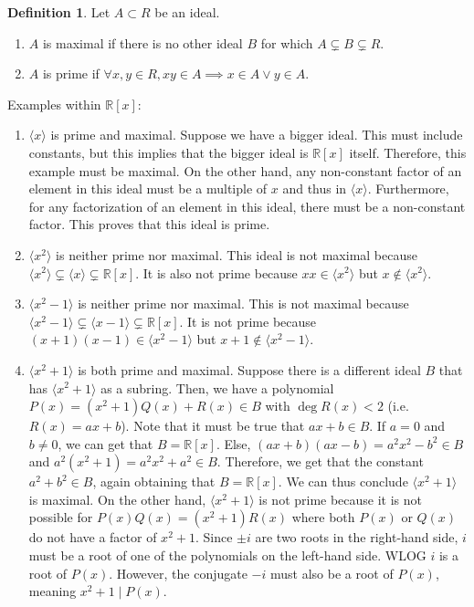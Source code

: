 \documentclass{article}
\theoremstyle{definition}
\newtheorem{definition}{Definition}
\theoremstyle{plain}
\theoremstyle{corollary}
\theoremstyle{lemma}
\begin{document}
\begin{definition}
    Let $A\subset R$ be an ideal.
    \begin{enumerate}
        \item $A$ is maximal if there is no other ideal $B$ for which $A\subsetneq B\subsetneq R$.
        \item $A$ is prime if $\forall x,y\in R,xy\in A\implies x\in A\lor y\in A$.
    \end{enumerate}
\end{definition}

Examples within $\mathbb{R}[x]$:
\begin{enumerate}
    \item $\langle x\rangle$ is prime and maximal. Suppose we have a bigger ideal. This must include constants, but this implies that the bigger ideal is $\mathbb{R}[x]$ itself. Therefore, this example must be maximal. On the other hand, any non-constant factor of an element in this ideal must be a multiple of $x$ and thus in $\langle x\rangle$. Furthermore, for any factorization of an element in this ideal, there must be a non-constant factor. This proves that this ideal is prime.
    \item $\langle x^2\rangle$ is neither prime nor maximal. This ideal is not maximal because $\langle x^2\rangle\subsetneq\langle x\rangle\subsetneq\mathbb{R}[x]$. It is also not prime because $xx\in\langle x^2\rangle$ but $x\notin\langle x^2\rangle$.
    \item $\langle x^2-1\rangle$ is neither prime nor maximal. This is not maximal because $\langle x^2-1\rangle\subsetneq\langle x-1\rangle\subsetneq\mathbb{R}[x]$. It is not prime because $(x+1)(x-1)\in\langle x^2-1\rangle$ but $x+1\notin\langle x^2-1\rangle$.
    \item $\langle x^2+1\rangle$ is both prime and maximal. Suppose there is a different ideal $B$ that has $\langle x^2+1\rangle$ as a subring. Then, we have a polynomial $P(x)=(x^2+1)Q(x)+R(x)\in B$ with $\deg R(x)<2$ (i.e. $R(x)=ax+b$). Note that it must be true that $ax+b\in B$. If $a=0$ and $b\neq0$, we can get that $B=\mathbb{R}[x]$. Else, $(ax+b)(ax-b)=a^2x^2-b^2\in B$ and $a^2(x^2+1)=a^2x^2+a^2\in B$. Therefore, we get that the constant $a^2+b^2\in B$, again obtaining that $B=\mathbb{R}[x]$. We can thus conclude $\langle x^2+1\rangle$ is maximal. On the other hand, $\langle x^2+1\rangle$ is not prime because it is not possible for $P(x)Q(x)=(x^2+1)R(x)$ where both $P(x)$ or $Q(x)$ do not have a factor of $x^2+1$. Since $\pm i$ are two roots in the right-hand side, $i$ must be a root of one of the polynomials on the left-hand side. WLOG $i$ is a root of $P(x)$. However, the conjugate $-i$ must also be a root of $P(x)$, meaning $x^2+1\mid P(x)$.
\end{enumerate}
\end{document}
